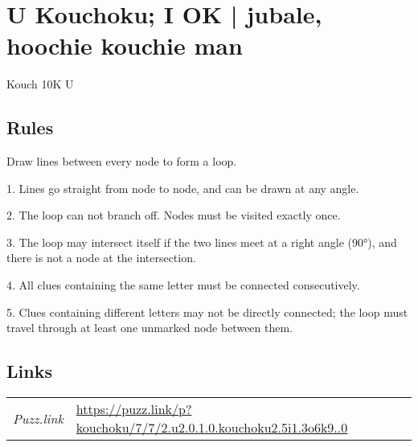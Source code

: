 \section[U Kouchoku; I OK | jubale, hoochie kouchie man {[\emph{Kouchoku!}]}]{U Kouchoku; I OK | {\normalfont jubale, hoochie kouchie man}}
\label{sec:20-u-kouchoku-i-ok-jubale-hoochie-kouchie-man}
Kouch 10K U
\subsection*{Rules}
\begin{markdown}
Draw lines between every node to form a loop.



1. Lines go straight from node to node, and can be drawn at any angle.



2. The loop can not branch off. Nodes must be visited exactly once.



3. The loop may intersect itself if the two lines meet at a right angle (90°), and there is not a node at the intersection.



4. All clues containing the same letter must be connected consecutively.



5. Clues containing different letters may not be directly connected; the loop must travel through at least one unmarked node between them.
\end{markdown}
\subsection*{Links}
\begin{tabularx}{\textwidth}{l X}
\emph{Puzz.link} & \url{https://puzz.link/p?kouchoku/7/7/2.u2.0.1.0.kouchoku2.5i1.3o6k9..0} \\
\end{tabularx}
\pagebreak
